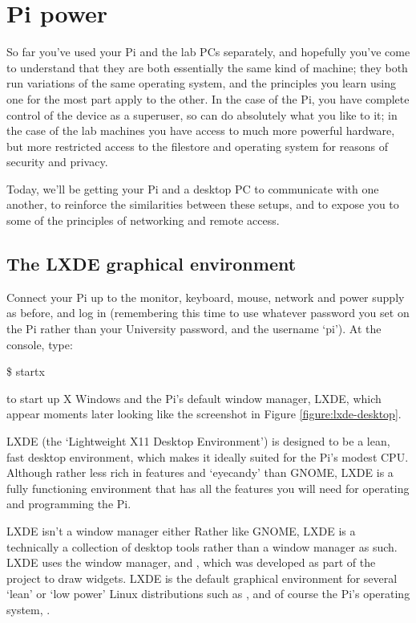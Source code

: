 \chapter{Pi power}
\minitoc
{}

So far you've used your Pi and the lab PCs separately, and hopefully you've come to understand that they are both essentially the same kind of machine; they both run variations of the same operating system, and the principles you learn using one for the most part apply to the other. In the case of the Pi, you have complete control of the device as a superuser, so can do absolutely what you like to it; in the case of the lab machines you have access to much more powerful hardware, but more restricted access to the filestore and operating system for reasons of security and privacy. 

Today, we'll be getting your Pi and a desktop PC to communicate with one another, to reinforce the similarities between these setups, and to expose you to some of the principles of networking and remote access. 

\section{The LXDE graphical environment}

Connect your Pi up to the monitor, keyboard, mouse, network and power supply as before, and log in (remembering this time to use whatever password you set on the Pi rather than your University password, and the username `pi'). At the console, type:

\begin{ttoutenv}
\$ startx
\end{ttoutenv}

to start up X Windows and the Pi's default window manager, LXDE, which appear moments later looking like the screenshot in Figure \ref{figure:lxde-desktop}. 

LXDE (the `Lightweight X11 Desktop Environment') is designed to be a lean, fast desktop environment, which makes it ideally suited for the Pi's modest CPU. Although rather less rich in features and `eyecandy' than GNOME, LXDE is a fully functioning environment that has all the features you will need for operating and programming the Pi. 


\begin{linux}{LXDE isn't a window manager either}
Rather like GNOME, LXDE is a technically a collection of desktop tools rather than a window manager as such. LXDE uses the  window manager, and , which was developed as part of the  project to draw widgets. LXDE is the default graphical environment for several `lean' or `low power' Linux distributions such as ,  and of course the Pi's operating system, . 
\end{linux}


